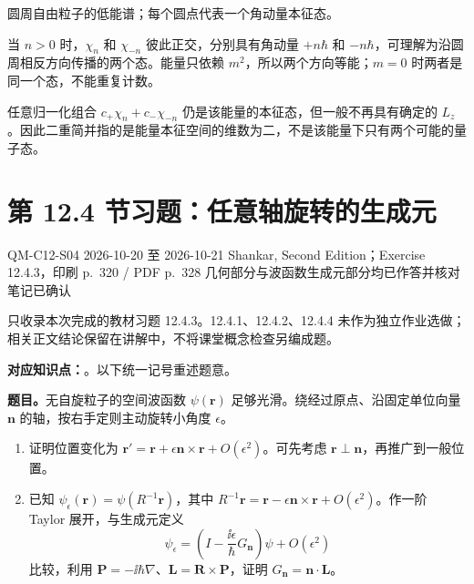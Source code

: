 \begin{checkedsolution}
\begin{center}
\small 圆周自由粒子的低能谱；每个圆点代表一个角动量本征态。
\end{center}
当 $n>0$ 时，$\chi_n$ 和 $\chi_{-n}$ 彼此正交，分别具有角动量 $+n\hbar$ 和 $-n\hbar$，可理解为沿圆周相反方向传播的两个态。能量只依赖 $m^2$，所以两个方向等能；$m=0$ 时两者是同一个态，不能重复计数。

任意归一化组合 $c_+\chi_n+c_-\chi_{-n}$ 仍是该能量的本征态，但一般不再具有确定的 $L_z$。因此二重简并指的是能量本征空间的维数为二，不是该能量下只有两个可能的量子态。
\end{checkedsolution}

\section{第 12.4 节习题：任意轴旋转的生成元}
\label{exercises:QM-C12-S04}
\exercisemeta
  {QM-C12-S04}
  {2026-10-20 至 2026-10-21}
  {Shankar, Second Edition；Exercise 12.4.3，印刷 p.~320 / PDF p.~328}
  {几何部分与波函数生成元部分均已作答并核对}
  {笔记已确认}

只收录本次完成的教材习题 12.4.3。12.4.1、12.4.2、12.4.4 未作为独立作业选做；相关正文结论保留在讲解中，不将课堂概念检查另编成题。

\textbf{对应知识点：}。以下统一记号重述题意。

\textbf{题目。}无自旋粒子的空间波函数 $\psi(\mathbf r)$ 足够光滑。绕经过原点、沿固定单位向量 $\mathbf n$ 的轴，按右手定则主动旋转小角度 $\epsilon$。
\begin{enumerate}
  \item 证明位置变化为 $\mathbf r'=\mathbf r+\epsilon\mathbf n\times\mathbf r+O(\epsilon^2)$。可先考虑 $\mathbf r\perp\mathbf n$，再推广到一般位置。
  \item 已知 $\psi_\epsilon(\mathbf r)=\psi(R^{-1}\mathbf r)$，其中 $R^{-1}\mathbf r=\mathbf r-\epsilon\mathbf n\times\mathbf r+O(\epsilon^2)$。作一阶 Taylor 展开，与生成元定义
    \begin{equation}
      \psi_\epsilon=\left(I-\frac{\ii\epsilon}{\hbar}G_{\mathbf n}\right)\psi
        +O(\epsilon^2)
    \end{equation}
    比较，利用 $\mathbf P=-\ii\hbar\nabla$、$\mathbf L=\mathbf R\times\mathbf P$，证明 $G_{\mathbf n}=\mathbf n\cdot\mathbf L$。
\end{enumerate}

